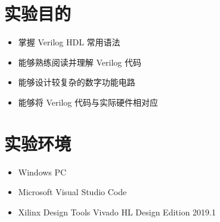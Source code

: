 \documentclass[UTF8,fontset=fandol]{ctexart}
\begin{document}
\section*{实验目的}
\begin{itemize}
    \item 掌握 Verilog HDL 常用语法
    \item 能够熟练阅读并理解 Verilog 代码
    \item 能够设计较复杂的数字功能电路
    \item 能够将 Verilog 代码与实际硬件相对应
\end{itemize}
\section*{实验环境}
\begin{itemize}
    \item Windows PC
    \item Microsoft Visual Studio Code
    \item Xilinx Design Tools Vivado HL Design Edition 2019.1 
\end{itemize}
\end{document}
